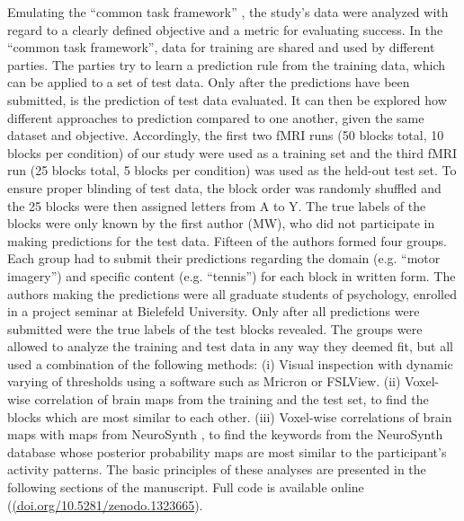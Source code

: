 \documentclass[fleqn,10pt]{SelfArx} %
\begin{document}
Emulating the “common task framework” \citep{Liberman_2015,Donoho_2017}, the study's data were analyzed with regard to a clearly defined objective and a metric for evaluating success. In the “common task framework”, data for training are shared and used by different parties. The parties try to learn a prediction rule from the training data, which can be applied to a set of test data. Only after the predictions have been submitted, is the prediction of test data evaluated. It can then be explored how different approaches to prediction compared to one another, given the same dataset and objective.
Accordingly, the first two fMRI runs (50 blocks total, 10 blocks per condition) of our study were used as a training set and the third fMRI run (25 blocks total, 5 blocks per condition) was used as the held-out test set. To ensure proper blinding of test data, the block order was randomly shuffled and the 25 blocks were then assigned letters from A to Y. The true labels of the blocks were only known by the first author (MW), who did not participate in making predictions for the test data. Fifteen of the authors formed four groups. Each group had to submit their predictions regarding the domain (e.g. “motor imagery”) and specific content (e.g. “tennis”) for each block in written form.
The authors making the predictions were all graduate students of psychology, enrolled in a project seminar at Bielefeld University. Only after all predictions were submitted were the true labels of the test blocks revealed.
The groups were allowed to analyze the training and test data in any way they deemed fit, but all used a combination of the following methods: (i) Visual inspection with dynamic varying of thresholds using a software such as Mricron or FSLView. (ii) Voxel-wise correlation of brain maps from the training and the test set, to find the blocks which are most similar to each other. (iii) Voxel-wise correlations of brain maps with maps from NeuroSynth \citep{Yarkoni_2011}, to find the keywords from the NeuroSynth database whose posterior probability maps are most similar to the participant's activity patterns. The basic principles of these analyses are presented in the following sections of the manuscript. Full code is available online  (\href{(https://doi.org/10.5281/zenodo.1323665}{(doi.org/10.5281/zenodo.1323665}).
\end{document}
